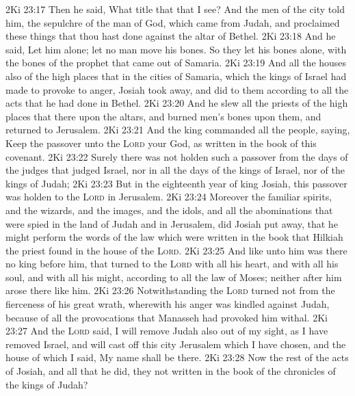 \vs 2Ki 23:17 Then he said, What title  that that I see? And the men of the city told him,  the sepulchre of the man of God, which came from Judah, and proclaimed these things that thou hast done against the altar of Bethel.
\vs 2Ki 23:18 And he said, Let him alone; let no man move his bones. So they let his bones alone, with the bones of the prophet that came out of Samaria.
\vs 2Ki 23:19 And all the houses also of the high places that  in the cities of Samaria, which the kings of Israel had made to provoke  to anger, Josiah took away, and did to them according to all the acts that he had done in Bethel.
\vs 2Ki 23:20 And he slew all the priests of the high places that  there upon the altars, and burned men's bones upon them, and returned to Jerusalem.
\vs 2Ki 23:21 And the king commanded all the people, saying, Keep the passover unto the \textsc{Lord} your God, as  written in the book of this covenant.
\vs 2Ki 23:22 Surely there was not holden such a passover from the days of the judges that judged Israel, nor in all the days of the kings of Israel, nor of the kings of Judah;
\vs 2Ki 23:23 But in the eighteenth year of king Josiah,  this passover was holden to the \textsc{Lord} in Jerusalem.
\vs 2Ki 23:24 Moreover the  familiar spirits, and the wizards, and the images, and the idols, and all the abominations that were spied in the land of Judah and in Jerusalem, did Josiah put away, that he might perform the words of the law which were written in the book that Hilkiah the priest found in the house of the \textsc{Lord}.
\vs 2Ki 23:25 And like unto him was there no king before him, that turned to the \textsc{Lord} with all his heart, and with all his soul, and with all his might, according to all the law of Moses; neither after him arose there  like him.
\vs 2Ki 23:26 Notwithstanding the \textsc{Lord} turned not from the fierceness of his great wrath, wherewith his anger was kindled against Judah, because of all the provocations that Manasseh had provoked him withal.
\vs 2Ki 23:27 And the \textsc{Lord} said, I will remove Judah also out of my sight, as I have removed Israel, and will cast off this city Jerusalem which I have chosen, and the house of which I said, My name shall be there.
\vs 2Ki 23:28 Now the rest of the acts of Josiah, and all that he did,  they not written in the book of the chronicles of the kings of Judah?
